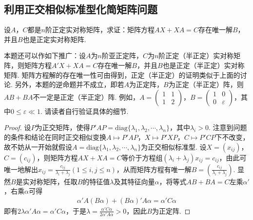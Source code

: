 \documentclass[../../main.tex]{subfiles}
\begin{document}
\subsection{利用正交相似标准型化简矩阵问题}

\begin{proposition}\label{proposition:例9.69}
设\(A\)，\(C\)都是\(n\)阶正定实对称矩阵，求证：矩阵方程\(AX + XA = C\)存在唯一解\(B\)，并且\(B\)也是正定实对称矩阵.
\end{proposition}
\begin{remark}
本题还可以作如下推广：设\(A\)为\(n\)阶亚正定阵，\(C\)为\(n\)阶正定（半正定）实对称矩阵，则矩阵方程\(A'X + XA = C\)存在唯一解\(B\)，并且\(B\)也是正定（半正定）实对称矩阵. 矩阵方程解的存在唯一性可由得到，正定（半正定）的证明类似于上面的讨论. 另外，本题的逆命题并不成立，即若\(A\)为正定阵，\(B\)为正定（半正定）阵，则\(AB + BA\)不一定是正定（半正定）阵. 例如，\(A=\begin{pmatrix}1&1\\1&2\end{pmatrix}\)，\(B=\begin{pmatrix}1&0\\0&\varepsilon\end{pmatrix}\)，其中\(0\leq\varepsilon\ll1\). 请读者自行验证具体的细节.
\end{remark}
\begin{proof}
设\(P\)为正交矩阵，使得\(P'AP=\mathrm{diag}\{\lambda_1,\lambda_2,\cdots,\lambda_n\}\)，其中\(\lambda_i > 0\). 注意到问题的条件和结论在同时正交相似变换\(A\mapsto P'AP\)，\(X\mapsto P'XP\)，\(C\mapsto P'CP\)下不改变，故不妨从一开始就假设\(A = \mathrm{diag}\{\lambda_1,\lambda_2,\cdots,\lambda_n\}\)为正交相似标准型. 设\(X=(x_{ij})\)，\(C=(c_{ij})\)，则矩阵方程\(AX + XA = C\)等价于方程组\((\lambda_i + \lambda_j)x_{ij}=c_{ij}\)，由此可唯一地解出\(x_{ij}=\frac{c_{ij}}{\lambda_i + \lambda_j}(1\leq i,j\leq n)\)，从而矩阵方程有唯一解\(B = (\frac{c_{ij}}{\lambda_i + \lambda_j})\). 显然\(B\)是实对称矩阵，任取\(B\)的特征值\(\lambda\)及其特征向量\(\alpha\)，将等式\(AB + BA = C\)左乘\(\alpha'\)，右乘\(\alpha\)可得
\begin{align*}
\alpha'A(B\alpha)+(B\alpha)'A\alpha=\alpha'C\alpha
\end{align*}
即有\(2\lambda\alpha'A\alpha=\alpha'C\alpha\)，于是\(\lambda=\frac{\alpha'C\alpha}{2\alpha'A\alpha}>0\)，因此\(B\)为正定阵.
\end{proof}
\end{document}
